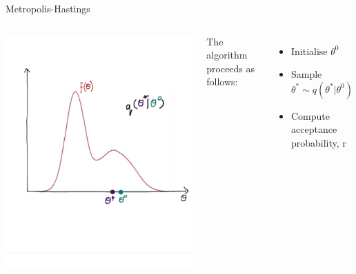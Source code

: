 \documentclass[compress]{beamer}
\begin{document}
\begin{frame}[label=sec-7-9]{Metropolis-Hastings}
\begin{columns}[c] 
\includegraphics[width=0.8\linewidth]{MH2}

The algorithm proceeds as follows:\\
\begin{itemize}
\item Initialise $\theta^{0}$
\item Sample $\theta^* \sim q(\theta^*|\theta^{0})$
\item Compute acceptance probability, r
\end {itemize}
\end{columns}
\end{frame}
\end{document}
